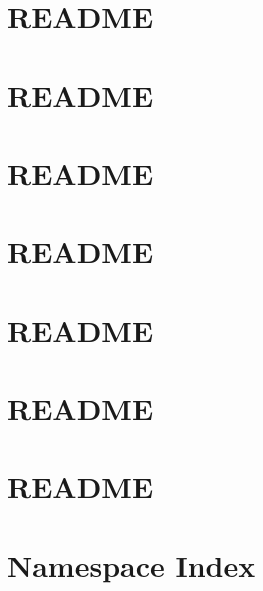 \documentclass[twoside]{book}
\newcommand{\+}{\discretionary{\mbox{\scriptsize$\hookleftarrow$}}{}{}}
\begin{document}
\chapter{README}
\label{md_smacc2_sm_reference_library_sm_ferrari_README}

\chapter{README}
\label{md_smacc2_sm_reference_library_sm_husky_barrel_search_1_README}

\chapter{README}
\label{md_smacc2_sm_reference_library_sm_multi_stage_1_README}

\chapter{README}
\label{md_smacc2_sm_reference_library_sm_pubsub_1_README}

\chapter{README}
\label{md_smacc2_sm_reference_library_sm_respira_1_README}

\chapter{README}
\label{md_smacc2_sm_reference_library_sm_test_moveit_ur5_sim_README}

\chapter{README}
\label{md_smacc2_sm_reference_library_sm_three_some_README}

\chapter{Namespace Index}

\end{document}
